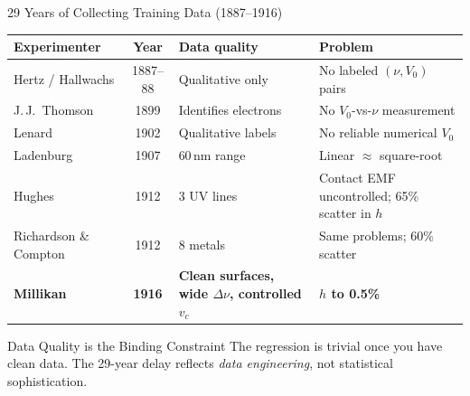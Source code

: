 \documentclass[aspectratio=169,12pt]{beamer}
\begin{document}
\begin{frame}[shrink=10]{29 Years of Collecting Training Data (1887--1916)}

\begin{center}
\small
\begin{tabular}{p{2.8cm}cp{3.8cm}p{4.5cm}}
\toprule
Experimenter & Year & Data quality & Problem \\
\midrule
Hertz / Hallwachs & 1887--88 & Qualitative only & No labeled $(\nu,V_0)$ pairs \\
J.\,J.\ Thomson   & 1899     & Identifies electrons & No $V_0$-vs-$\nu$ measurement \\
Lenard            & 1902     & Qualitative labels & No reliable numerical $V_0$ \\
Ladenburg         & 1907     & 60\,nm range & Linear $\approx$ square-root \\
Hughes            & 1912     & 3 UV lines & Contact EMF uncontrolled; 65\% scatter in $h$ \\
Richardson \& Compton & 1912 & 8 metals  & Same problems; 60\% scatter \\
\midrule
\textbf{Millikan} & \textbf{1916} & \textbf{Clean surfaces, wide $\Delta\nu$, controlled $v_c$} & \textbf{$h$ to 0.5\%} \\
\bottomrule
\end{tabular}
\end{center}

\bigskip
\begin{block}{Data Quality is the Binding Constraint}
The regression is trivial once you have clean data.
The 29-year delay reflects \emph{data engineering}, not statistical
sophistication.
\end{block}

\end{frame}
\end{document}
